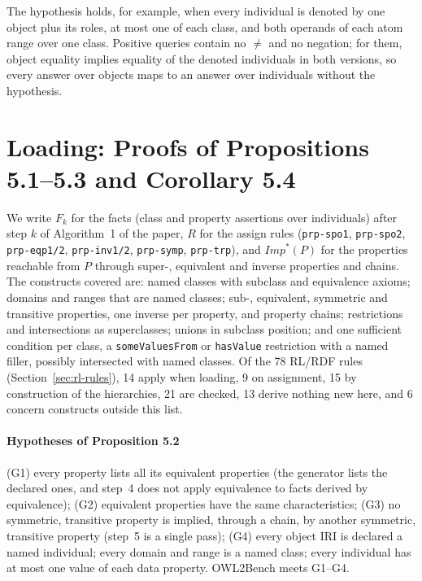 The hypothesis holds, for example, when every individual is denoted by one object plus its roles,
at most one of each class, and both operands of each atom range over one class. Positive queries
contain no $\neq$ and no negation; for them, object equality implies equality of the denoted
individuals in both versions, so every answer over objects maps to an answer over individuals
without the hypothesis.

\section{Loading: Proofs of Propositions 5.1--5.3 and Corollary 5.4}
\label{sec:loading-proofs}

We write $F_k$ for the facts (class and property assertions over individuals) after step $k$ of
Algorithm~1 of the paper, $R$ for the assign rules (\texttt{prp-spo1}, \texttt{prp-spo2},
\texttt{prp-eqp1/2}, \texttt{prp-inv1/2}, \texttt{prp-symp}, \texttt{prp-trp}), and
$\mathit{Imp}^*(P)$ for the properties reachable from $P$ through super-, equivalent and inverse
properties and chains. The constructs covered are: named classes with subclass and equivalence
axioms; domains and ranges that are named classes; sub-, equivalent, symmetric and transitive
properties, one inverse per property, and property chains; restrictions and intersections as
superclasses; unions in subclass position; and one sufficient condition per class, a
\texttt{someValuesFrom} or \texttt{hasValue} restriction with a named filler, possibly intersected
with named classes. Of the 78 RL/RDF rules (Section~\ref{sec:rl-rules}), 14 apply when loading, 9
on assignment, 15 by construction of the hierarchies, 21 are checked, 13 derive nothing new here,
and 6 concern constructs outside this list.

\paragraph{Hypotheses of Proposition 5.2} (G1) every property lists all its equivalent properties
(the generator lists the declared ones, and step~4 does not apply equivalence to facts derived by
equivalence); (G2) equivalent properties have the same characteristics; (G3) no symmetric,
transitive property is implied, through a chain, by another symmetric, transitive property
(step~5 is a single pass); (G4) every object IRI is declared a named individual; every domain and
range is a named class; every individual has at most one value of each data property. OWL2Bench
meets G1--G4.

